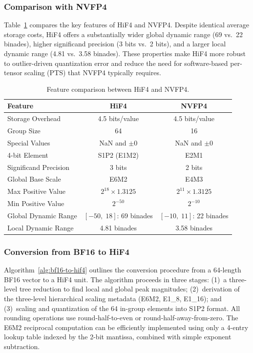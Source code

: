 \documentclass{article}
\begin{document}
\subsubsection{Comparison with NVFP4}

Table~\ref{tab:hif4-vs-nvfp4} compares the key features of HiF4 and NVFP4.
Despite identical average storage costs, HiF4 offers a substantially wider
global dynamic range (69 vs.\ 22 binades), higher significand precision (3 bits
vs.\ 2 bits), and a larger local dynamic range (4.81 vs.\ 3.58 binades). These
properties make HiF4 more robust to outlier-driven quantization error and
reduce the need for software-based per-tensor scaling (PTS) that NVFP4
typically requires.

\begin{table}[h]
\caption{Feature comparison between HiF4 and NVFP4.}
\label{tab:hif4-vs-nvfp4}
\centering
\small
\begin{tabular}{@{}lcc@{}}
\toprule
Feature & HiF4 & NVFP4 \\
\midrule
Storage Overhead       & 4.5 bits/value & 4.5 bits/value \\
Group Size             & 64             & 16 \\
Special Values         & NaN and $\pm 0$ & NaN and $\pm 0$ \\
4-bit Element          & S1P2 (E1M2)   & E2M1 \\
Significand Precision  & 3 bits         & 2 bits \\
Global Base Scale      & E6M2           & E4M3 \\
Max Positive Value     & $2^{18} \times 1.3125$ & $2^{11} \times 1.3125$ \\
Min Positive Value     & $2^{-50}$      & $2^{-10}$ \\
Global Dynamic Range   & $[-50,\;18]$: 69 binades & $[-10,\;11]$: 22 binades \\
Local Dynamic Range    & 4.81 binades   & 3.58 binades \\
\bottomrule
\end{tabular}
\end{table}

\subsubsection{Conversion from BF16 to HiF4}

Algorithm~\ref{alg:bf16-to-hif4} outlines the conversion procedure from a
64-length BF16 vector to a HiF4 unit. The algorithm proceeds in three stages:
(1)~a three-level tree reduction to find local and global peak magnitudes;
(2)~derivation of the three-level hierarchical scaling metadata (E6M2, E1\_8,
E1\_16); and (3)~scaling and quantization of the 64 in-group elements into S1P2
format. All rounding operations use round-half-to-even or
round-half-away-from-zero. The E6M2 reciprocal computation can be efficiently
implemented using only a 4-entry lookup table indexed by the 2-bit mantissa,
combined with simple exponent subtraction.
\end{document}
